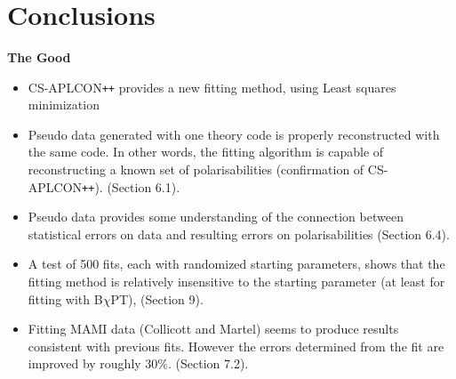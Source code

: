 \documentclass[]{article}
\begin{document}
\begin{figure}[h!]
	\centering
	\\
	\\	
	\\		
\end{figure}

\newpage
\section{Conclusions}

\textbf{The Good}

\begin{itemize}
	\item CS-APLCON\texttt{++} provides a new fitting method, using Least squares minimization
	\item Pseudo data generated with one theory code is properly reconstructed with the same code. In other words, the fitting algorithm is capable of reconstructing a known set of polarisabilities (confirmation of CS-APLCON\texttt{++}). (Section 6.1).
	\item Pseudo data provides some understanding of the connection between statistical errors on data and resulting errors on polarisabilities (Section 6.4).
	\item A test of 500 fits, each with randomized starting parameters, shows that the fitting method is relatively insensitive to the starting parameter (at least for fitting with B$\chi$PT), (Section 9). 
	\item Fitting MAMI data (Collicott and Martel) seems to produce results consistent with previous fits. However the errors determined from the fit are improved by roughly 30$\%$. (Section 7.2).
\end{itemize}
\end{document}
